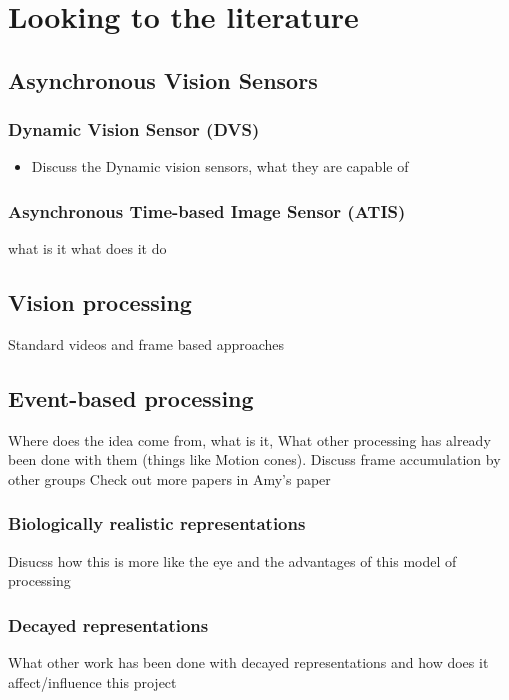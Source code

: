 \chapter{Looking to the literature}


\section{Asynchronous Vision Sensors}  %
\subsection{Dynamic Vision Sensor (DVS)}
\begin{itemize}
    \item Discuss the Dynamic vision sensors, what they are capable of
\end{itemize}

\subsection{Asynchronous Time-based Image Sensor (ATIS)}
what is it what does it do

\pagebreak
\section{Vision processing}   %
Standard videos and frame based approaches

\pagebreak
\section{Event-based processing}     %
Where does the idea come from, what is it, 
What other processing has already been done with them (things like Motion cones).
Discuss frame accumulation by other groups
Check out more papers in Amy's paper

\subsection{Biologically realistic representations}
Disucss how this is more like the eye and the advantages of this model of processing

\pagebreak
\subsection{Decayed representations}  %
What other work has been done with decayed representations and how does it affect/influence this project


